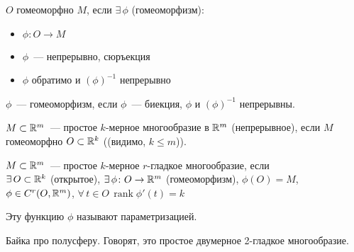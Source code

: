 
\begin{defin*}
    $O$ гомеоморфно $M$, если $\exists\,\phi$ (гомеоморфизм):\begin{itemize}
        \item $\phi \colon O\to M$
        \item $\phi$~--- непрерывно, сюръекция
        \item $\phi$ обратимо и $(\phi)^{-1}$ непрерывно
    \end{itemize}
\end{defin*}

\begin{defin*}
    $\phi$~--- гомеоморфизм, если $\phi$~--- биекция, $\phi$ и $(\phi)^{-1}$ непрерывны.
\end{defin*}

\begin{defin*}
    $M\subset \rmy$~--- простое $k$-мерное многообразие в $\rmy$ (непрерывное), если $M$ гомеоморфно $O\subset\rmy[k]$ ((видимо, $k\leqslant m$)). 
\end{defin*}

\begin{defin*}
    $M\subset \rmy$~--- простое $k$-мерное $r$-гладкое многообразие, если\\
    $\exists\,O\subset\rmy[k]$ (открытое), $\exists\,\phi\colon O\to\rmy$ (гомеоморфизм), $\phi(O)=M$,\\
    $\phi\in C^r(O,\rmy)$, $\forall\,t\in O\,\operatorname{rank}\phi'(t)=k$
\end{defin*}

\begin{defin*}
    Эту функцию $\phi$ называют параметризацией.
\end{defin*}

Байка про полусферу. Говорят, это простое двумерное 2-гладкое многообразие.

